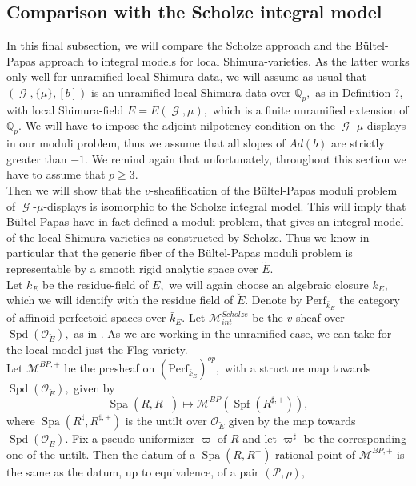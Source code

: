 \documentclass[a4paper,10,5 pt]{amsart}
\theoremstyle{definition}
\DeclareMathOperator{\Spa}{Spa}
\DeclareMathOperator{\Spd}{Spd}
\DeclareMathOperator{\Spf}{Spf}
\DeclareMathOperator{\G}{\mathcal{G}}
\begin{document}
\subsection{Comparison with the Scholze integral model}
In this final subsection, we will compare the Scholze approach and the Bültel-Papas approach to integral models for local Shimura-varieties. As the latter works only well for unramified local Shimura-data, we will assume as usual that $(\G,\lbrace \mu \rbrace, [b])$ is an unramified local Shimura-data over $\mathbb{Q}_{p},$ as in Definition ?, with local Shimura-field $E=E(\G,\mu),$ which is a finite unramified extension of $\mathbb{Q}_{p}.$ We will have to impose the adjoint nilpotency condition on the $\G$-$\mu$-displays in our moduli problem, thus we assume that all slopes of $Ad(b)$ are strictly greater than $-1.$ We remind again that unfortunately, throughout this section we have to assume that $p\geq 3.$ 
\\
Then we will show that the $v$-sheafification of the Bültel-Papas moduli problem of $\G$-$\mu$-displays is isomorphic to the Scholze integral model. This will imply that Bültel-Papas have in fact defined a moduli problem, that gives an integral model of the local Shimura-varieties as constructed by Scholze. Thus we know in particular that the generic fiber of the Bültel-Papas moduli problem is representable by a smooth rigid analytic space over $\breve{E}.$
\\
Let $k_{E}$ be the residue-field of $E,$ we will again choose an algebraic closure $\bar{k}_{E},$ which we will identify with the residue field of $\breve{E}.$ Denote by $\text{Perf}_{\bar{k}_{E}}$ the category of affinoid perfectoid spaces over $\bar{k}_{E}.$ Let $\mathcal{M}_{int}^{Scholze}$ be the $v$-sheaf over $\Spd(\mathcal{O}_{\breve{E}}),$ as in  \cite[Def. 25.1.1.]{Berkeley lectures}. As we are working in the unramified case, we can take for the local model just the Flag-variety.
\\
Let $\mathcal{M}^{BP,+}$ be the presheaf on $(\text{Perf}_{\bar{k}_{E}})^{op},$ with a structure map towards $\Spd(\mathcal{O}_{\breve{E}}),$ given by
$$
\Spa(R,R^{+})\mapsto \mathcal{M}^{BP}(\Spf(R^{\sharp,+})),
$$
where $\Spa(R^{\sharp},R^{\sharp,+})$ is the untilt over $\mathcal{O}_{\breve{E}}$ given by the map towards $\Spd(\mathcal{O}_{\breve{E}}).$ Fix a pseudo-uniformizer $\varpi$ of $R$ and let $\varpi^{\sharp}$ be the corresponding one of the untilt. Then the datum of a $\Spa(R,R^{+})$-rational point of $\mathcal{M}^{BP,+}$ is the same as the datum, up to equivalence, of a pair $(\mathcal{P},\rho),$
\end{document}
